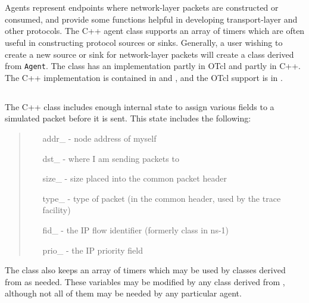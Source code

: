 %
%
\section{}

Agents represent endpoints where network-layer
packets are constructed or consumed, and provide
some functions helpful in developing transport-layer and other
protocols.
The C++ agent class supports an array of
timers which are often
useful in constructing protocol sources or sinks.
Generally, a user wishing to create a new
source or sink for network-layer packets
will create a class derived from {\tt Agent}.
The class  has an implementation partly in
OTcl and partly in C++.
The C++ implementation is contained in  and
, and the OTcl support is in
.

\subsection{}

The C++ class  includes enough internal state
to assign various fields to a simulated packet before
it is sent.
This state includes the following:
\begin{quote}
\begin{itemize}
        \item[addr\_] - node address of myself
        \item[dst\_] - where I am sending packets to
        \item[size\_] - size placed into the common packet header
        \item[type\_] - type of packet (in the common header, used by the trace facility)
        \item[fid\_] - the IP flow identifier (formerly class in ns-1)
        \item[prio\_] - the IP priority field
\end{itemize}
\end{quote}
The class also keeps an array of timers which may be used
by classes derived from  as needed.
These variables may be modified by any class derived from ,
although not all of them may be needed by any particular agent.

